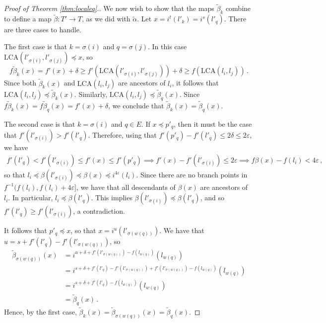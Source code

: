 \documentclass{article}
\theoremstyle{definition}
\newcommand{\LCA}{\mathrm{LCA}}
\renewcommand{\epsilon}{\varepsilon}
\begin{document}
\begin{proof}[Proof of Theorem \ref{thm:localeq}.]
We now wish to show that the maps $\widetilde\beta_k$ combine to define a map $\widetilde\beta:T' \to T$, as we did with $\widetilde\alpha$. Let $x = i^t(l'_k) = i^s(l'_q)$. There are three cases to handle.

The first case is that $k = \sigma(i)$ and $q = \sigma(j)$. In this case $\LCA(l'_{\sigma(i)}, l'_{\sigma(j)})\preceq x$, so
\begin{equation*}
    f\widetilde\beta_k(x) = f'(x) + \delta \geq f'(\LCA(l'_{\sigma(i)}, l'_{\sigma(j)})) + \delta \geq f(\LCA(l_i,l_j))\,.
\end{equation*}
Since both $\widetilde\beta_k(x)$ and $\LCA(l_i,l_j)$ are ancestors of $l_i$, it follows that $\LCA(l_i,l_j) \preceq \widetilde \beta_k(x)$. Similarly, $\LCA(l_i,l_j) \preceq \widetilde \beta_q(x)$. Since $f\widetilde\beta_k(x) = f\widetilde\beta_q(x) = f'(x) + \delta$, we conclude that $\widetilde\beta_k(x) = \widetilde\beta_q(x)$.

The second case is that $k = \sigma(i)$ and $q \in E$. If $x \preceq p'_q$, then it must be the case that $f'(l'_{\sigma(i)}) > f'(l'_q)$. Therefore, using that $f'(p'_q) - f'(l'_q) \leq 2\delta \leq 2\epsilon$, we have
\begin{align*}
    f'(l'_q) < f'(l'_{\sigma(i)}) \leq f'(x) \leq f'(p'_q) \implies f'(x) - f'(l'_{\sigma(i)}) \leq 2\epsilon \implies f\beta(x) - f(l_i) < 4\epsilon\,,
\end{align*}
so that $l_i \preceq \beta(l'_{\sigma(i)}) \preceq \beta(x) \preceq i^{4\epsilon}(l_i)$. Since there are no branch points in $f^{-1}(f(l_i),f(l_i) + 4\epsilon]$, we have that all descendants of $\beta(x)$ are ancestors of $l_i$. In particular, $l_i \preceq \beta(l'_q)$. This implies $\beta(l'_{\sigma(i)}) \preceq \beta(l'_q)$, and so $f'(l'_q) \geq f'(l'_{\sigma(i)})$, a contradiction.

It follows that $p'_q \preceq x$, so that $x = i^u(l'_{\sigma(w(q))})$. We have that $u = s + f'(l'_q) - f'(l'_{\sigma(w(q))})$, so
\begin{align*}
    \widetilde\beta_{\sigma(w(q))}(x) &= i^{u + \delta + f'(l'_{\sigma(w(q))}) - f(l_{w(q)})}(l_{w(q)})\\
    & = i^{s + \delta + f'(l'_q) - f'(l'_{\sigma(w(q))}) + f'(l'_{\sigma(w(q))}) - f(l_{w(q)})}(l_{w(q)})\\
    &= i^{s + \delta + f'(l'_q) - f(l_{w(q)})}(l_{w(q)})\\
    & = \widetilde\beta_{q}(x)\,.
\end{align*}
Hence, by the first case, $\widetilde\beta_k(x) = \widetilde\beta_{\sigma(w(q))}(x) = \widetilde{\beta}_{q}(x)$.


\end{proof}
\end{document}
